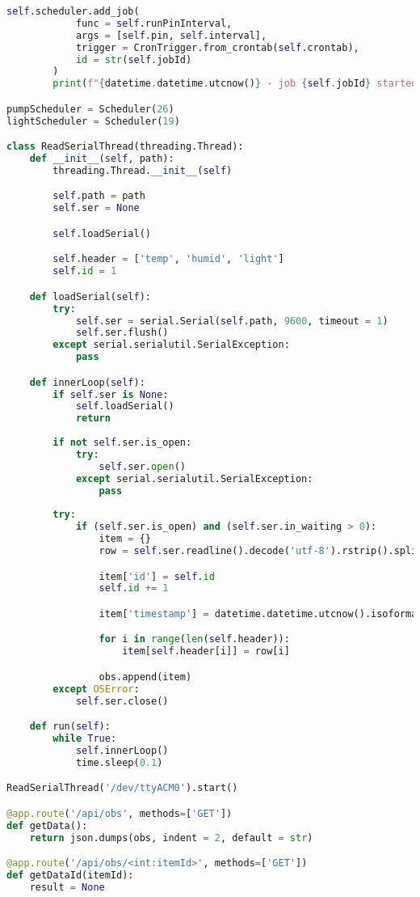 \documentclass[a4paper,12pt,twoside,openright,titlepage]{book}
\begin{document}
\begin{lstlisting}[title={raspberrypi/api/data.py}, language=Python]
        self.scheduler.add_job(
            func = self.runPinInterval,
            args = [self.pin, self.interval],
            trigger = CronTrigger.from_crontab(self.crontab),
            id = str(self.jobId)
        )
        print(f"{datetime.datetime.utcnow()} - job {self.jobId} started")

pumpScheduler = Scheduler(26)
lightScheduler = Scheduler(19)

class ReadSerialThread(threading.Thread):
    def __init__(self, path):
        threading.Thread.__init__(self)

        self.path = path
        self.ser = None

        self.loadSerial()

        self.header = ['temp', 'humid', 'light']
        self.id = 1

    def loadSerial(self):
        try:
            self.ser = serial.Serial(self.path, 9600, timeout = 1)
            self.ser.flush()
        except serial.serialutil.SerialException:
            pass

    def innerLoop(self):
        if self.ser is None:
            self.loadSerial()
            return
        
        if not self.ser.is_open:
            try:
                self.ser.open()
            except serial.serialutil.SerialException:
                pass
        
        try:
            if (self.ser.is_open) and (self.ser.in_waiting > 0):
                item = {}
                row = self.ser.readline().decode('utf-8').rstrip().split(',')

                item['id'] = self.id
                self.id += 1

                item['timestamp'] = datetime.datetime.utcnow().isoformat()

                for i in range(len(self.header)):
                    item[self.header[i]] = row[i]

                obs.append(item)
        except OSError:
            self.ser.close()

    def run(self):
        while True:
            self.innerLoop()
            time.sleep(0.1)

ReadSerialThread('/dev/ttyACM0').start()

@app.route('/api/obs', methods=['GET'])
def getData():
    return json.dumps(obs, indent = 2, default = str)

@app.route('/api/obs/<int:itemId>', methods=['GET'])
def getDataId(itemId):
    result = None


\end{lstlisting}
\end{document}
